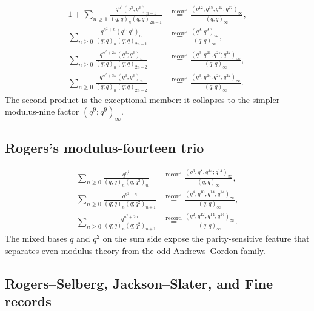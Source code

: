 \begin{align}
 1+\sum_{n\ge1}
 \frac{q^{n^2}(q^3;q^3)_{n-1}}
 {(q;q)_n(q;q)_{2n-1}}
 &\mathrel{\stackrel{\mathrm{record}}{=}}
 \frac{(q^{12},q^{15},q^{27};q^{27})_\infty}
 {(q;q)_\infty},
 \tag{SR-D27.1}\label{qg:eq-record-d27-1}\\
 \sum_{n\ge0}
 \frac{q^{n^2+n}(q^3;q^3)_n}
 {(q;q)_n(q;q)_{2n+1}}
 &\mathrel{\stackrel{\mathrm{record}}{=}}
 \frac{(q^9;q^9)_\infty}{(q;q)_\infty},
 \tag{SR-D27.2}\label{qg:eq-record-d27-2}\\
 \sum_{n\ge0}
 \frac{q^{n^2+2n}(q^3;q^3)_n}
 {(q;q)_n(q;q)_{2n+2}}
 &\mathrel{\stackrel{\mathrm{record}}{=}}
 \frac{(q^6,q^{21},q^{27};q^{27})_\infty}
 {(q;q)_\infty},
 \tag{SR-D27.3}\label{qg:eq-record-d27-3}\\
 \sum_{n\ge0}
 \frac{q^{n^2+3n}(q^3;q^3)_n}
 {(q;q)_n(q;q)_{2n+2}}
 &\mathrel{\stackrel{\mathrm{record}}{=}}
 \frac{(q^3,q^{24},q^{27};q^{27})_\infty}
 {(q;q)_\infty}.
 \tag{SR-D27.4}\label{qg:eq-record-d27-4}
\end{align}
The second product is the exceptional member: it collapses to the simpler
modulus-nine factor \((q^9;q^9)_\infty\).

\subsection{Rogers's modulus-fourteen trio}

\begin{align}
 \sum_{n\ge0}\frac{q^{n^2}}
 {(q;q)_n(q;q^2)_n}
 &\mathrel{\stackrel{\mathrm{record}}{=}}
 \frac{(q^6,q^8,q^{14};q^{14})_\infty}{(q;q)_\infty},
 \tag{SR-R14.1}\label{qg:eq-record-r14-1}\\
 \sum_{n\ge0}\frac{q^{n^2+n}}
 {(q;q)_n(q;q^2)_{n+1}}
 &\mathrel{\stackrel{\mathrm{record}}{=}}
 \frac{(q^4,q^{10},q^{14};q^{14})_\infty}{(q;q)_\infty},
 \tag{SR-R14.2}\label{qg:eq-record-r14-2}\\
 \sum_{n\ge0}\frac{q^{n^2+2n}}
 {(q;q)_n(q;q^2)_{n+1}}
 &\mathrel{\stackrel{\mathrm{record}}{=}}
 \frac{(q^2,q^{12},q^{14};q^{14})_\infty}{(q;q)_\infty}.
 \tag{SR-R14.3}\label{qg:eq-record-r14-3}
\end{align}
The mixed bases \(q\) and \(q^2\) on the sum side expose the parity-sensitive
feature that separates even-modulus theory from the odd Andrews--Gordon
family.

\subsection{Rogers--Selberg, Jackson--Slater, and Fine records}

